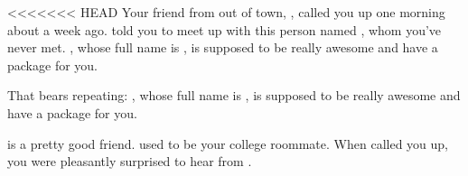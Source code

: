 \documentclass[char]{guildcamp3}
\begin{document}
\name{\cNobleOne{}}

\updatemacro{\cNPC}{
  \unknownplayer %
  }





<<<<<<< HEAD
Your friend from out of town, \cSomeGuy{\intro}, called you up one
morning about a week ago.  \cSomeGuy{} told you to meet up with this
person named \cNPC{}, whom you've never met.  \cNPC{}, whose full name
is \cNPC{\intro}, is supposed to be really awesome and have a package
for you.

That bears repeating: \cNPC{\nick{\informal}}, whose full name is
\cNPC{\full}, is supposed to be really awesome and have a package for
you.

\cSomeGuy{} is a pretty good friend.  \cSomeGuy{\They} used to be your
college roommate.  When \cSomeGuy{\they} called you up, you were
pleasantly surprised to hear from \cSomeGuy{\them}.
\end{document}
